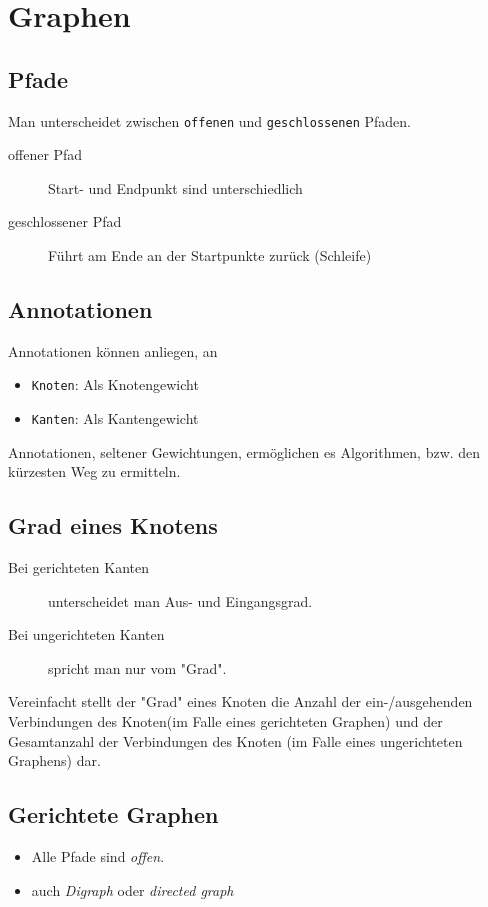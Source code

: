 \documentclass{book}
\begin{document}
\section{Graphen}
\subsection{Pfade} Man unterscheidet zwischen \texttt{offenen} und \texttt{geschlossenen} Pfaden.
\begin{description}
	\item[offener Pfad] Start- und Endpunkt sind unterschiedlich
	\item[geschlossener Pfad]  Führt am Ende an der Startpunkte zurück (Schleife)
\end{description}
\subsection{Annotationen}
Annotationen können anliegen, an
\begin{itemize}
	\item \texttt{Knoten}: Als Knotengewicht
	\item \texttt{Kanten}: Als Kantengewicht
\end{itemize}
Annotationen, seltener Gewichtungen, ermöglichen es Algorithmen, bzw. den kürzesten Weg zu ermitteln.
\subsection{Grad eines Knotens}
\begin{description}
	\item[Bei gerichteten Kanten] unterscheidet man Aus- und Eingangsgrad.
	\item[Bei ungerichteten Kanten] spricht man nur vom "Grad". 
\end{description}
Vereinfacht stellt der "Grad" eines Knoten die Anzahl der ein-/ausgehenden Verbindungen des Knoten(im Falle eines gerichteten Graphen) 
und der Gesamtanzahl der Verbindungen des Knoten (im Falle eines ungerichteten Graphens) dar.
\subsection{Gerichtete Graphen}
\begin{itemize}
	\item Alle Pfade sind \textit{offen}.
	\item auch \textit{Digraph} oder \textit{directed graph}
\end{itemize}
\end{document}
